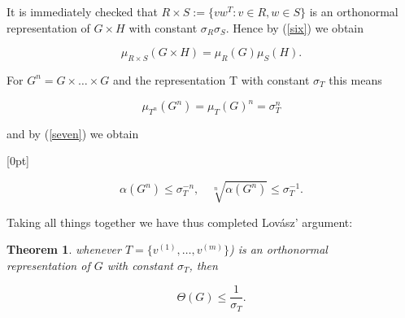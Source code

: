 \documentclass[openany,12pt]{memoir}
\newtheorem*{thm}{Theorem}                                                         %
\begin{document}
It is immediately checked that $R \times S := \{vw^T : v \in R, w \in S\}$ is an
orthonormal representation of $G \times H$ with constant $\sigma_R \sigma_S$. Hence by (\ref{six}) 
we obtain 

\[
\mu_{R \times S}(G \times H) = \mu_{R}(G)\mu_{S}(H).
\]

For $G^n = G \times \ldots \times G$ and the representation T with constant $\sigma_T$ this
means 

\[
\mu_{T^n}(G^n) = \mu_{T}(G)^n = \sigma_{T}^n
\]

and by (\ref{seven}) we obtain

[0pt]

\[
\alpha(G^n) \leq \sigma_{T}^{-n},  \quad   \sqrt[n]{\alpha(G^n)} \leq \sigma_{T}^{-1}.
\]

Taking all things together we have thus completed Lov\'asz' argument: 


\begin{thm}\label{theorem}
whenever $T = \{v^{(1)}, \ldots, v^{(m)}\}$) is an orthonormal\\ 
representation of $G$ with constant $\sigma_T$, then

\begin{equation}
    \Theta(G) \leq {\frac{1}{\sigma_T}}. \label{eight}
\end{equation}

\end{thm}
\end{document}
